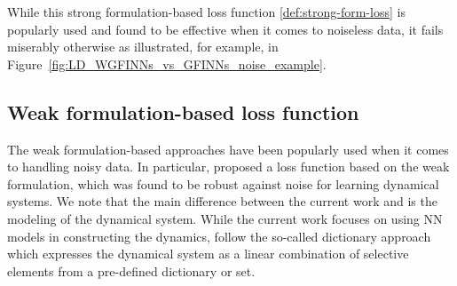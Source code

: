\documentclass[final]{siamltex}
\newcommand{\bfa}[1]{\boldsymbol{#1}}
\begin{document}

While this strong formulation-based loss function \eqref{def:strong-form-loss} is popularly used and found to be effective when it comes to noiseless data, it fails miserably otherwise as illustrated, for example, in Figure~\ref{fig:LD_WGFINNs_vs_GFINNs_noise_example}. 


\subsection{Weak formulation-based loss function}
\label{sec:weak_form_setup}
The weak formulation-based approaches have been popularly used when it comes to handling noisy data.
In particular, \cite{tran2024weak,messenger2021weak} proposed a loss function based on the weak formulation, which was found to be robust against noise for learning dynamical systems. 
We note that the main difference between the current work and \cite{tran2024weak,messenger2021weak} is the modeling of the dynamical system. 
While the current work focuses on using NN models in constructing the dynamics, \cite{tran2024weak,messenger2021weak} follow the so-called dictionary approach which expresses the dynamical system as a linear combination of selective elements from a pre-defined dictionary or set.
\end{document}
